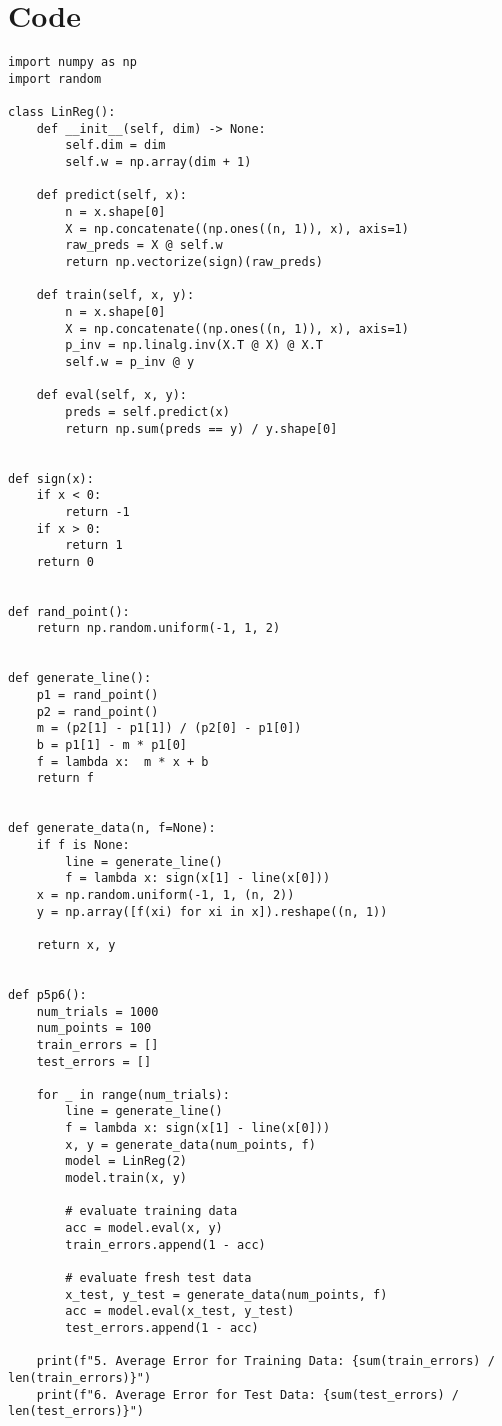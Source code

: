 \documentclass[answers]{exam}
\begin{document}
\section*{Code}

\begin{verbatim}
import numpy as np
import random

class LinReg():
    def __init__(self, dim) -> None:
        self.dim = dim
        self.w = np.array(dim + 1)

    def predict(self, x):
        n = x.shape[0]
        X = np.concatenate((np.ones((n, 1)), x), axis=1)
        raw_preds = X @ self.w
        return np.vectorize(sign)(raw_preds)

    def train(self, x, y):
        n = x.shape[0]
        X = np.concatenate((np.ones((n, 1)), x), axis=1)
        p_inv = np.linalg.inv(X.T @ X) @ X.T
        self.w = p_inv @ y

    def eval(self, x, y):
        preds = self.predict(x)
        return np.sum(preds == y) / y.shape[0]


def sign(x):
    if x < 0:
        return -1
    if x > 0:
        return 1
    return 0


def rand_point():
    return np.random.uniform(-1, 1, 2)


def generate_line():
    p1 = rand_point()
    p2 = rand_point()
    m = (p2[1] - p1[1]) / (p2[0] - p1[0])
    b = p1[1] - m * p1[0]
    f = lambda x:  m * x + b
    return f


def generate_data(n, f=None):
    if f is None:
        line = generate_line()
        f = lambda x: sign(x[1] - line(x[0]))
    x = np.random.uniform(-1, 1, (n, 2))
    y = np.array([f(xi) for xi in x]).reshape((n, 1))

    return x, y


def p5p6():
    num_trials = 1000
    num_points = 100
    train_errors = []
    test_errors = []

    for _ in range(num_trials):
        line = generate_line()
        f = lambda x: sign(x[1] - line(x[0]))
        x, y = generate_data(num_points, f)
        model = LinReg(2)
        model.train(x, y)

        # evaluate training data
        acc = model.eval(x, y)
        train_errors.append(1 - acc)

        # evaluate fresh test data
        x_test, y_test = generate_data(num_points, f)
        acc = model.eval(x_test, y_test)
        test_errors.append(1 - acc)

    print(f"5. Average Error for Training Data: {sum(train_errors) / len(train_errors)}")
    print(f"6. Average Error for Test Data: {sum(test_errors) / len(test_errors)}")



\end{verbatim}
\end{document}
